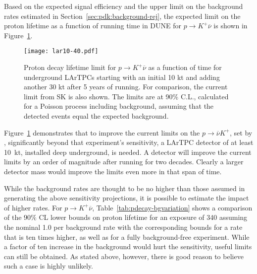 Based on the expected signal efficiency and the upper limit on the
background rates estimated in Section~\ref{sec:pdk:background-rej}, 
the expected limit on the proton
lifetime as a function of running time in DUNE for $p \rightarrow K^+
\overline{\nu}$ is shown in 
Figure~\ref{fig:kdklimit}. 
\begin{figure}[!htb]
\centering
\texttt{[image: lar10-40.pdf]}
\caption[Proton decay lifetime limit for $p \rightarrow K^+ \overline{\nu}$
  versus time]{Proton decay lifetime limit for $p
  \rightarrow K^+ \overline{\nu}$ as a function of time for
  underground LArTPCs starting with an initial 10 kt and adding another 30 kt
after 5 years of running.
  For comparison, the current limit from SK is also shown.
  The limits are at 90\% C.L., calculated for
  a Poisson process including background, assuming that the detected events
  equal the expected background.}
\label{fig:kdklimit}
\end{figure}
%
Figure~\ref{fig:kdklimit} demonstrates that 
to improve the current limits on
the $p \rightarrow \overline{\nu} K^+$, set by \superk, significantly
beyond that experiment's sensitivity, 
a LArTPC
detector of at least 10~kt, installed deep underground, is needed.
A  detector will improve the current limits by an order of
magnitude after running for two decades.  Clearly a larger detector
mass would improve the limits even more in that span of time.

While the background rates are thought to be no higher than those assumed 
in generating the above sensitivity projections, it is possible to estimate 
the impact of higher rates.  For $p\to K^+\overline{\nu}$, 
Table~\ref{tab:pdecay-bgvariation} shows a comparison of the 
$90\%$ CL lower bounds on proton lifetime for an exposure  of \SI{340}{\ktyr} 
assuming the nominal 1.0 per  \SI{}{\Mtyr} background rate with the 
corresponding bounds for a rate that is ten times higher, as well as for 
a fully background-free experiment.
%
%
While a factor of ten increase in the background would hurt the 
sensitivity, useful limits can still be obtained.  As stated 
above, however, there is good reason to believe such a case 
is highly unlikely.
%

